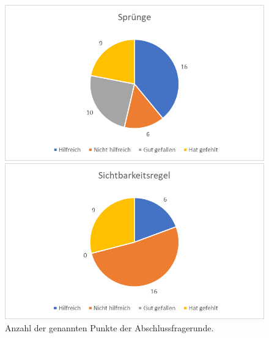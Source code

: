 \begin{figure}
   \begin{minipage}[b]{.49\linewidth} %
      \includegraphics[width=\linewidth]{pictures/diagramme/aussagenspr}
   \end{minipage}
   \hspace{.01\linewidth}%
   \begin{minipage}[b]{.49\linewidth} %
      \includegraphics[width=\linewidth]{pictures/diagramme/aussagensichtb}
   \end{minipage}
   \caption{Anzahl der genannten Punkte der Abschlussfragerunde.}
\end{figure}

